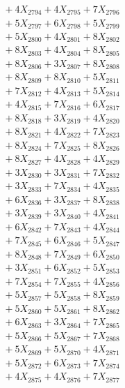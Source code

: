 \documentclass[a4paper,10pt]{article}
\begin{document}
{\begin{align}
&\;  + 4 X_{2794} + 4 X_{2795} + 7 X_{2796} \\[0.3ex]
&\;  + 5 X_{2797} + 6 X_{2798} + 5 X_{2799} \\[0.5ex]\allowbreak
&\;  + 5 X_{2800} + 4 X_{2801} + 8 X_{2802} \\[0.3ex]
&\;  + 8 X_{2803} + 4 X_{2804} + 8 X_{2805} \\[0.3ex]
&\;  + 8 X_{2806} + 3 X_{2807} + 8 X_{2808} \\[0.3ex]
&\;  + 8 X_{2809} + 8 X_{2810} + 5 X_{2811} \\[0.3ex]
&\;  + 7 X_{2812} + 4 X_{2813} + 5 X_{2814} \\[0.3ex]
&\;  + 4 X_{2815} + 7 X_{2816} + 6 X_{2817} \\[0.3ex]
&\;  + 8 X_{2818} + 3 X_{2819} + 4 X_{2820} \\[0.3ex]
&\;  + 8 X_{2821} + 4 X_{2822} + 7 X_{2823} \\[0.3ex]
&\;  + 8 X_{2824} + 7 X_{2825} + 8 X_{2826} \\[0.3ex]
&\;  + 8 X_{2827} + 4 X_{2828} + 4 X_{2829} \\[0.5ex]\allowbreak
&\;  + 3 X_{2830} + 3 X_{2831} + 7 X_{2832} \\[0.3ex]
&\;  + 3 X_{2833} + 7 X_{2834} + 4 X_{2835} \\[0.3ex]
&\;  + 6 X_{2836} + 3 X_{2837} + 8 X_{2838} \\[0.3ex]
&\;  + 3 X_{2839} + 3 X_{2840} + 4 X_{2841} \\[0.3ex]
&\;  + 6 X_{2842} + 7 X_{2843} + 4 X_{2844} \\[0.3ex]
&\;  + 7 X_{2845} + 6 X_{2846} + 5 X_{2847} \\[0.3ex]
&\;  + 8 X_{2848} + 7 X_{2849} + 6 X_{2850} \\[0.3ex]
&\;  + 3 X_{2851} + 6 X_{2852} + 5 X_{2853} \\[0.3ex]
&\;  + 7 X_{2854} + 7 X_{2855} + 4 X_{2856} \\[0.3ex]
&\;  + 5 X_{2857} + 5 X_{2858} + 8 X_{2859} \\[0.5ex]\allowbreak
&\;  + 5 X_{2860} + 5 X_{2861} + 8 X_{2862} \\[0.3ex]
&\;  + 6 X_{2863} + 3 X_{2864} + 7 X_{2865} \\[0.3ex]
&\;  + 5 X_{2866} + 5 X_{2867} + 7 X_{2868} \\[0.3ex]
&\;  + 5 X_{2869} + 5 X_{2870} + 4 X_{2871} \\[0.3ex]
&\;  + 5 X_{2872} + 6 X_{2873} + 7 X_{2874} \\[0.3ex]
&\;  + 4 X_{2875} + 4 X_{2876} + 7 X_{2877} \\[0.3ex]

\end{align}}
\end{document}
